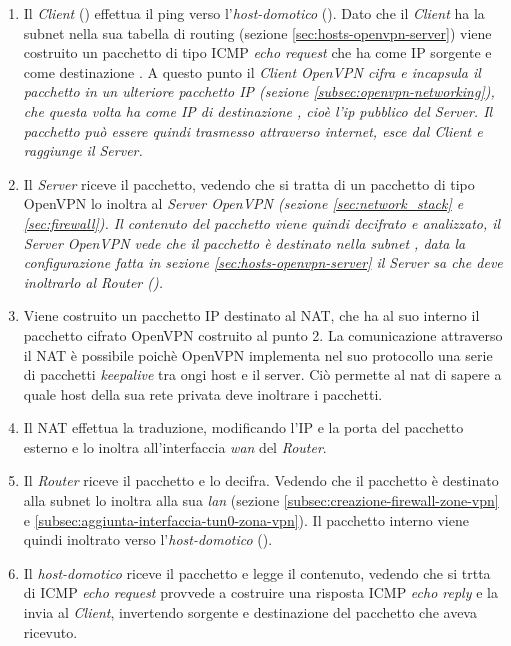 \begin{enumerate}
    \item Il \textit{Client} () effettua il ping verso l'\textit{host-domotico} (). Dato che il \textit{Client} ha la subnet  nella sua tabella di routing (sezione \ref{sec:hosts-openvpn-server}) viene costruito un pacchetto di tipo ICMP \textit{echo request} che ha come IP sorgente  e come destinazione . A questo punto il \it{Client OpenVPN} cifra e incapsula il pacchetto in un ulteriore pacchetto IP (sezione \ref{subsec:openvpn-networking}), che questa volta ha come IP di destinazione , cioè l'ip pubblico del \textit{Server}. Il pacchetto può essere quindi trasmesso attraverso internet, esce dal \textit{Client} e raggiunge il \textit{Server}.
    

    \item Il \textit{Server} riceve il pacchetto, vedendo che si tratta di un pacchetto di tipo OpenVPN lo inoltra al \it{Server OpenVPN} (sezione \ref{sec:network_stack} e \ref{sec:firewall}). Il contenuto del pacchetto viene quindi decifrato e analizzato, il \textit{Server OpenVPN} vede che il pacchetto è destinato nella subnet , data la configurazione fatta in sezione \ref{sec:hosts-openvpn-server} il \it{Server} sa che deve inoltrarlo al \textit{Router} ().
    

    \item Viene costruito un pacchetto IP destinato al NAT, che ha al suo interno il pacchetto cifrato OpenVPN costruito al punto 2. La comunicazione attraverso il NAT è possibile poichè OpenVPN implementa nel suo protocollo una serie di pacchetti \textit{keepalive} tra ongi host e il server. Ciò permette al nat di sapere a quale host della sua rete privata deve inoltrare i pacchetti.
    
    \item Il NAT effettua la traduzione, modificando l'IP e la porta del pacchetto esterno e lo inoltra all'interfaccia \textit{wan} del \textit{Router}.
    

    \item Il \textit{Router} riceve il pacchetto e lo decifra. Vedendo che il pacchetto è destinato alla subnet  lo inoltra alla sua \textit{lan} (sezione \ref{subsec:creazione-firewall-zone-vpn} e \ref{subsec:aggiunta-interfaccia-tun0-zona-vpn}). Il pacchetto interno viene quindi inoltrato verso l'\textit{host-domotico} ().
    
    \item Il \textit{host-domotico} riceve il pacchetto e legge il contenuto, vedendo che si trtta di ICMP \textit{echo request} provvede a costruire una risposta ICMP \textit{echo reply} e la invia al \textit{Client}, invertendo sorgente e destinazione del pacchetto che aveva ricevuto.

\end{enumerate}


